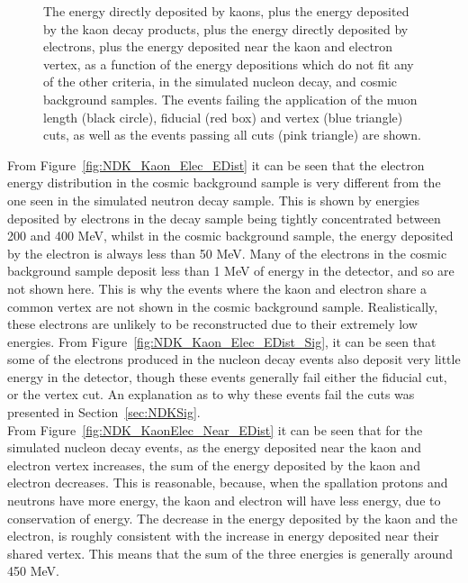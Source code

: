 \begin{figure}[h!]
          {The energy directly deposited by kaons, plus the energy deposited by the kaon decay products, plus the energy directly deposited by electrons, plus the energy deposited near the kaon and electron vertex, as a function of the energy depositions which do not fit any of the other criteria, in the simulated nucleon decay, and cosmic background samples. The events failing the application of the muon length (black circle), fiducial (red box) and vertex (blue triangle) cuts, as well as the events passing all cuts (pink triangle) are shown.}
  \label{fig:NDK_AllEDep_Other_EDist}
\end{figure}

From Figure~\ref{fig:NDK_Kaon_Elec_EDist} it can be seen that the electron energy distribution in the cosmic background sample is very different from the one seen in the simulated neutron decay sample. This is shown by energies deposited by electrons in the decay sample being tightly concentrated between 200 and 400 MeV, whilst in the cosmic background sample, the energy deposited by the electron is always less than 50 MeV. Many of the electrons in the cosmic background sample deposit less than 1 MeV of energy in the detector, and so are not shown here. This is why the events where the kaon and electron share a common vertex are not shown in the cosmic background sample. Realistically, these electrons are unlikely to be reconstructed due to their extremely low energies. From Figure~\ref{fig:NDK_Kaon_Elec_EDist_Sig}, it can be seen that some of the electrons produced in the nucleon decay events also deposit very little energy in the detector, though these events generally fail either the fiducial cut, or the vertex cut. An explanation as to why these events fail the cuts was presented in Section~\ref{sec:NDKSig}. \\

From Figure~\ref{fig:NDK_KaonElec_Near_EDist} it can be seen that for the simulated nucleon decay events, as the energy deposited near the kaon and electron vertex increases, the sum of the energy deposited by the kaon and electron decreases. This is reasonable, because, when the spallation protons and neutrons have more energy, the kaon and electron will have less energy, due to conservation of energy. The decrease in the energy deposited by the kaon and the electron, is roughly consistent with the increase in energy deposited near their shared vertex. This means that the sum of the three energies is generally around 450 MeV. \\

